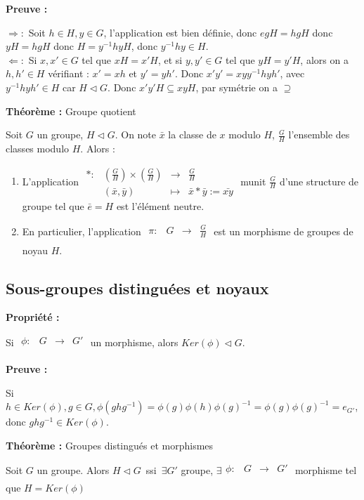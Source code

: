 \documentclass{report}
\newenvironment{preuve}{\begin{tcolorbox}[colframe= white]
    \textbf{Preuve :}
\par }
    {\end{tcolorbox}}
\newenvironment{prop}{\begin{tcolorbox}[colframe= white]
    \textbf{Propriété :}
     \par}
    {\end{tcolorbox}}
\newenvironment{theoreme}[1][]{
    \begin{tcolorbox}[]
    \textbf{Théorème :} #1  \par} 
    {\end{tcolorbox}}
\newcommand{\fonction}[5]{
    \begin{array}{l|rcl}
    #1: & #2 & \longrightarrow & #3 \\
        & #4 & \longmapsto & #5 
    \end{array}
}
\newcommand{\fctsarg}[3]{
    \begin{array}{lrcl}
    #1: & #2 & \longrightarrow & #3 \\
    \end{array}
}
\begin{document}
\begin{preuve}
$\Rightarrow :$ Soit $h \in H,y \in G$, l'application est bien définie, donc $egH = hgH$ donc $yH = hgH$ donc $H = y^{-1}hyH$, donc $y^{-1}hy \in H$.\\
$\Leftarrow : $ Si $x,x' \in G$ tel que $xH = x'H$, et si $y,y' \in G$ tel que $yH = y'H$, alors on a $h,h' \in H$ vérifiant : $x' = xh$ et $y' = yh'$. Donc $x'y' = xy y^{-1}hyh'$, avec $y^{-1}hyh' \in H$ car $H \triangleleft G$. Donc $x'y'H \subseteq xyH$, par symétrie on a $\supseteq$
\end{preuve}

\begin{theoreme}[Groupe quotient]
    Soit $G$ un groupe, $H \triangleleft G$. On note $\bar{x}$ la classe de $x$ modulo $H$, $\displaystyle\frac{G}{H}$ l'ensemble des classes modulo $H$. Alors : \par
    \begin{enumerate}
        \item L'application $\fonction{\ast}{(\displaystyle\frac{G}{H})\times (\displaystyle\frac{G}{H})}{\displaystyle\frac{G}{H}}{(\bar{x},\bar{y})}{\bar{x} \ast \bar{y} := \bar{xy}}$ munit $\displaystyle\frac{G}{H}$ d'une structure de groupe tel que $\bar{e} = H$ est l'élément neutre.
        \item En particulier, l'application $\fctsarg{\pi}{G}{\displaystyle\frac{G}{H}}$ est un morphisme de groupes de noyau $H$.
    \end{enumerate}
\end{theoreme}

\subsection{Sous-groupes distinguées et noyaux}

\begin{prop}
    Si $\fctsarg{\phi}{G}{G'}$ un morphisme, alors $Ker(\phi) \triangleleft G$.
\end{prop}

\begin{preuve}
    Si $h \in Ker(\phi), g \in G, \phi(ghg^{-1}) = \phi(g)\phi(h)\phi(g)^{-1} = \phi(g)\phi(g)^{-1} = e_{G'}$, donc $ghg^{-1} \in Ker(\phi)$.
\end{preuve}

\begin{theoreme}[Groupes distingués et morphismes]
    Soit $G$ un groupe. Alors $H \triangleleft G \,$ ssi $\, \exists G'$ groupe, $\exists \fctsarg{\phi}{G}{G'}$ morphisme tel que $H = Ker(\phi)$
\end{theoreme}
\end{document}
